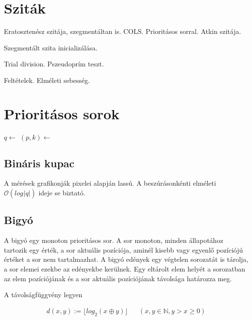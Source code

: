 \documentclass[12pt]{report}
\begin{document}
\section{Sziták}

Eratosztenész szitája, szegmentáltan is. COLS. Prioritásos sorral. Atkin szitája.

Szegmentált szita inicializálása.

Trial division. Pszeudoprím teszt.

Feltételek. Elméleti sebesség.

\section{Prioritásos sorok}

\begin{algorithmic}[1]
\State $q \gets$ 
		\State $(p, k) \gets $ 
		\State {}
		\State {}
	\EndWhile
		\State {}
	\EndIf
\EndFor
\end{algorithmic}

\subsection{Bináris kupac}

A mérések grafikonják pixelei alapján lassú. A beszúrásonkénti elméleti
$\mathcal{O}(log_{}{|q|})$ ideje se biztató.

\subsection{Bigyó}

A bigyó egy monoton prioritásos sor.
A sor monoton, minden állapotához tartozik egy érték, a sor aktuális pozíciója,
aminél kisebb vagy egyenlő pozíciójú értéket a sor nem tartalmazhat.
A bigyó edények egy végtelen sorozatát is tárolja, a sor elemei ezekbe az edényekbe kerülnek.
Egy eltárolt elem helyét a sorozatban az elem pozíciójának
és a sor aktuális pozíciójának távolsága határozza meg.

A távolságfüggvény legyen

\begin{align*}
d(x, y) := \lfloor log_{2}{}(x \oplus y) \rfloor & & (x, y \in \mathbb{N}, y > x \ge 0)
\end{align*}
\end{document}
